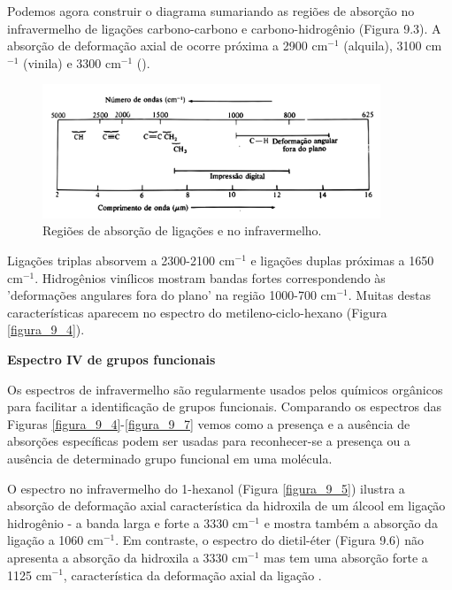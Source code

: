 Podemos agora construir o diagrama sumariando as regiões de absorção no infravermelho de ligações carbono-carbono e carbono-hidrogênio (Figura 9.3). A absorção de deformação axial de  ocorre próxima a 2900 cm$^{-1}$ (alquila), 3100 cm$^{-1}$ (vinila) e 3300 cm$^{-1}$ ().

\begin{figure}[H]
    \centering
    \includegraphics[width=0.9\textwidth,angle=0]{content/images/Figura_9_3.pdf}
    \caption{Regiões de absorção de ligações  e  no infravermelho.}
    \label{figura_9.3}
\end{figure}

Ligações triplas absorvem a 2300-2100 cm$^{-1}$ e ligações duplas próximas a 1650 cm$^{-1}$. Hidrogênios vinílicos mostram bandas fortes correspondendo às 'deformações angulares fora do plano' na região 1000-700 cm$^{-1}$. Muitas destas características aparecem no espectro do metileno-ciclo-hexano (Figura \ref{figura_9_4}).

\noindent\textbf{Espectro IV de grupos funcionais}

\noindent Os espectros de infravermelho são regularmente usados pelos químicos orgânicos para facilitar a identificação de grupos funcionais. Comparando os espectros das Figuras \ref{figura_9_4}-\ref{figura_9_7} vemos como a presença e a ausência de absorções específicas podem ser usadas para reconhecer-se a presença ou a ausência de determinado grupo funcional em uma molécula.

O espectro no infravermelho do 1-hexanol (Figura \ref{figura_9_5}) ilustra a absorção de deformação axial característica da hidroxila de um álcool em ligação hidrogênio - a banda larga e forte a 3330 cm$^{-1}$ e mostra também a absorção da ligação  a 1060 cm$^{-1}$. Em contraste, o espectro do dietil-éter (Figura 9.6) não apresenta a absorção da hidroxila a 3330 cm$^{-1}$ mas tem uma absorção forte a 1125 cm$^{-1}$, característica da deformação axial da ligação . 

